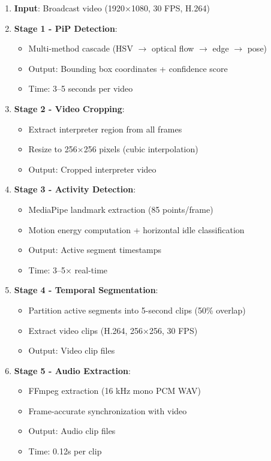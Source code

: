 \documentclass[11pt,a4paper]{article}
\begin{document}
\begin{enumerate}
    \item \textbf{Input}: Broadcast video (1920$\times$1080, 30 FPS, H.264)
    
    \item \textbf{Stage 1 - PiP Detection}:
    \begin{itemize}
        \item Multi-method cascade (HSV $\rightarrow$ optical flow $\rightarrow$ edge $\rightarrow$ pose)
        \item Output: Bounding box coordinates + confidence score
        \item Time: 3--5 seconds per video
    \end{itemize}
    
    \item \textbf{Stage 2 - Video Cropping}:
    \begin{itemize}
        \item Extract interpreter region from all frames
        \item Resize to 256$\times$256 pixels (cubic interpolation)
        \item Output: Cropped interpreter video
    \end{itemize}
    
    \item \textbf{Stage 3 - Activity Detection}:
    \begin{itemize}
        \item MediaPipe landmark extraction (85 points/frame)
        \item Motion energy computation + horizontal idle classification
        \item Output: Active segment timestamps
        \item Time: 3--5$\times$ real-time
    \end{itemize}
    
    \item \textbf{Stage 4 - Temporal Segmentation}:
    \begin{itemize}
        \item Partition active segments into 5-second clips (50\% overlap)
        \item Extract video clips (H.264, 256$\times$256, 30 FPS)
        \item Output: Video clip files
    \end{itemize}
    
    \item \textbf{Stage 5 - Audio Extraction}:
    \begin{itemize}
        \item FFmpeg extraction (16 kHz mono PCM WAV)
        \item Frame-accurate synchronization with video
        \item Output: Audio clip files
        \item Time: 0.12s per clip
    \end{itemize}
    

\end{enumerate}
\end{document}
